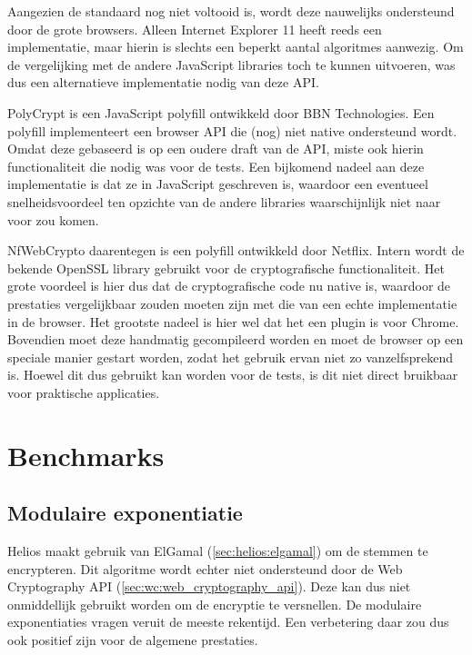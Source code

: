 Aangezien de standaard nog niet voltooid is, wordt deze nauwelijks ondersteund door de grote browsers.\cite{site:html5test_web_cryptography_api} Alleen Internet Explorer 11 heeft reeds een implementatie, maar hierin is slechts een beperkt aantal algoritmes aanwezig.\cite{site:microsoft_web_cryptography} Om de vergelijking met de andere JavaScript libraries toch te kunnen uitvoeren, was dus een alternatieve implementatie nodig van deze API.

\npar PolyCrypt is een JavaScript polyfill ontwikkeld door BBN Technologies.\cite{site:polycrypt} Een polyfill implementeert een browser API die (nog) niet native ondersteund wordt. Omdat deze gebaseerd is op een oudere draft van de API, miste ook hierin functionaliteit die nodig was voor de tests. Een bijkomend nadeel aan deze implementatie is dat ze in JavaScript geschreven is, waardoor een eventueel snelheidsvoordeel ten opzichte van de andere libraries waarschijnlijk niet naar voor zou komen.

\npar NfWebCrypto daarentegen is een \cplusplus polyfill ontwikkeld door Netflix.\cite{site:nfwebcrypto} Intern wordt de bekende OpenSSL library gebruikt voor de cryptografische functionaliteit. Het grote voordeel is hier dus dat de cryptografische code nu native is, waardoor de prestaties vergelijkbaar zouden moeten zijn met die van een echte implementatie in de browser. Het grootste nadeel is hier wel dat het een plugin is voor Chrome. Bovendien moet deze handmatig gecompileerd worden en moet de browser op een speciale manier gestart worden, zodat het gebruik ervan niet zo vanzelfsprekend is. Hoewel dit dus gebruikt kan worden voor de tests, is dit niet direct bruikbaar voor praktische applicaties.

\section{Benchmarks}
\label{sec:wc:benchmarks}

\subsection{Modulaire exponentiatie}
\label{sec:wc:modulaire_exponentiatie}

Helios maakt gebruik van ElGamal (\ref{sec:helios:elgamal}) om de stemmen te encrypteren. Dit algoritme wordt echter niet ondersteund door de Web Cryptography API (\ref{sec:wc:web_cryptography_api}). Deze kan dus niet onmiddellijk gebruikt worden om de encryptie te versnellen. De modulaire exponentiaties vragen veruit de meeste rekentijd. Een verbetering daar zou dus ook positief zijn voor de algemene prestaties.

